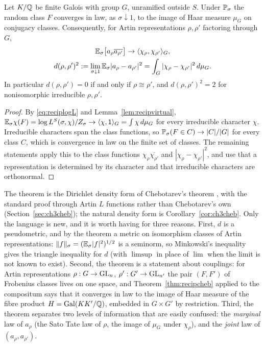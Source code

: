 \begin{theorem}\label{thm:recipcheb}
Let $K/\mathbb{Q}$ be finite Galois with group $G$, unramified outside $S$. Under $\mathbb{P}_\sigma$ the random class $F$ converges in law, as $\sigma\downarrow1$, to the image of Haar measure $\mu_G$ on conjugacy classes. Consequently, for Artin representations $\rho,\rho'$ factoring through $G$,
\begin{gather*}
\mathbb{E}_\sigma\bigl[a_\rho\overline{a_{\rho'}}\bigr]\to\langle\chi_\rho,\chi_{\rho'}\rangle_G,\\
d(\rho,\rho')^2:=\lim_{\sigma\downarrow1}\mathbb{E}_\sigma|a_\rho - a_{\rho'}|^2=\int_G|\chi_\rho - \chi_{\rho'}|^2\,d\mu_G .
\end{gather*}
In particular $d(\rho,\rho')=0$ if and only if $\rho\cong\rho'$, and $d(\rho,\rho')^2=2$ for nonisomorphic irreducible $\rho,\rho'$.
\end{theorem}

\begin{proof}
By \eqref{eq:reciplogL} and Lemma~\ref{lem:recipvirtual}, $\mathbb{E}_\sigma\chi(F)=\log L^S(\sigma,\chi)/Z_\sigma\to\langle\chi,\mathsf{1}\rangle_G=\int\chi\,d\mu_G$ for every irreducible character $\chi$. Irreducible characters span the class functions, so $\mathbb{P}_\sigma(F\in C)\to|C|/|G|$ for every class $C$, which is convergence in law on the finite set of classes. The remaining statements apply this to the class functions $\chi_\rho\overline{\chi_{\rho'}}$ and $|\chi_\rho-\chi_{\rho'}|^2$, and use that a representation is determined by its character and that irreducible characters are orthonormal.
\end{proof}

The theorem is the Dirichlet density form of Chebotarev's theorem \cite{chebotarev1926}, with the standard proof through Artin $L$ functions rather than Chebotarev's own (Section~\ref{sec:ch3cheb}); the natural density form is Corollary~\ref{cor:ch3cheb}. Only the language is new, and it is worth having for three reasons. First, $d$ is a pseudometric, and by the theorem a metric on isomorphism classes of Artin representations: $\|f\|_\sigma=(\mathbb{E}_\sigma|f|^2)^{1/2}$ is a seminorm, so Minkowski's inequality gives the triangle inequality for $d$ (with $\limsup$ in place of $\lim$ when the limit is not known to exist). Second, the theorem is a statement about couplings: for Artin representations $\rho:G\to\mathrm{GL}_n$, $\rho':G'\to\mathrm{GL}_{n'}$ the pair $(F,F')$ of Frobenius classes lives on one space, and Theorem~\ref{thm:recipcheb} applied to the compositum says that it converges in law to the image of Haar measure of the fibre product $H=\operatorname{Gal}(KK'/\mathbb{Q})$, embedded in $G\times G'$ by restriction. Third, the theorem separates two levels of information that are easily confused: the \emph{marginal} law of $a_\rho$ (the Sato Tate law of $\rho$, the image of $\mu_G$ under $\chi_\rho$), and the \emph{joint} law of $(a_\rho,a_{\rho'})$.

